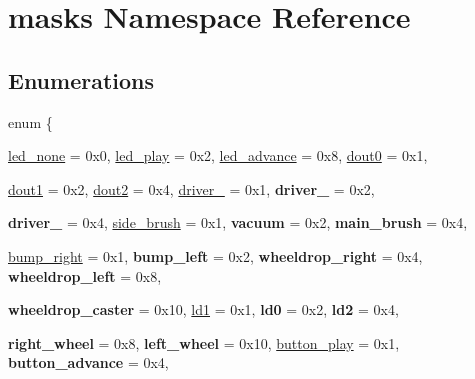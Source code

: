 \hypertarget{namespacemasks}{
\section{masks Namespace Reference}
\label{namespacemasks}
}
\subsection*{Enumerations}
\begin{DoxyCompactItemize}
\item 
enum \{ \par
\hyperlink{namespacemasks_af347462787e0a87a423f606696c00f3ca7e11cd5dade8d55df2d95be89583f07f}{led\_\-none} =  0x0, 
\hyperlink{namespacemasks_af347462787e0a87a423f606696c00f3ca131d0fa980487e0a7480691d5037eb47}{led\_\-play} =  0x2, 
\hyperlink{namespacemasks_af347462787e0a87a423f606696c00f3ca0c424fbe8bfa0fdb7aba5892155e5e50}{led\_\-advance} =  0x8, 
\hyperlink{namespacemasks_af347462787e0a87a423f606696c00f3cafb9a30f23d392dd5eda6be119670114e}{dout0} =  0x1, 
\par
\hyperlink{namespacemasks_af347462787e0a87a423f606696c00f3ca66fa5ccc5bbadd69049481f460341868}{dout1} =  0x2, 
\hyperlink{namespacemasks_af347462787e0a87a423f606696c00f3ca9eeb72a18c1343de3ecd29f2cf77e1d8}{dout2} =  0x4, 
\hyperlink{namespacemasks_af347462787e0a87a423f606696c00f3ca3cd74e3a46449d2d575ebbaad909228c}{driver\_} =  0x1, 
{\bfseries driver\_} =  0x2, 
\par
{\bfseries driver\_} =  0x4, 
\hyperlink{namespacemasks_af347462787e0a87a423f606696c00f3ca273e187aa5cc2dd0f2ef233d6d9febf4}{side\_\-brush} =  0x1, 
{\bfseries vacuum} =  0x2, 
{\bfseries main\_\-brush} =  0x4, 
\par
\hyperlink{namespacemasks_af347462787e0a87a423f606696c00f3cae181f5e31abd17a95e050feb13c17227}{bump\_\-right} =  0x1, 
{\bfseries bump\_\-left} =  0x2, 
{\bfseries wheeldrop\_\-right} =  0x4, 
{\bfseries wheeldrop\_\-left} =  0x8, 
\par
{\bfseries wheeldrop\_\-caster} =  0x10, 
\hyperlink{namespacemasks_af347462787e0a87a423f606696c00f3ca35e78aa3e8dbde629c2930b8626a1ea0}{ld1} =  0x1, 
{\bfseries ld0} =  0x2, 
{\bfseries ld2} =  0x4, 
\par
{\bfseries right\_\-wheel} =  0x8, 
{\bfseries left\_\-wheel} =  0x10, 
\hyperlink{namespacemasks_af347462787e0a87a423f606696c00f3cac0440aaa489e01aff712a991703b64b6}{button\_\-play} =  0x1, 
{\bfseries button\_\-advance} =  0x4, 
\par

\end{DoxyCompactItemize}
